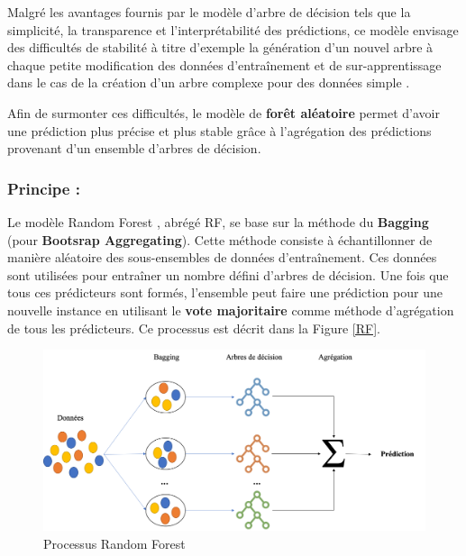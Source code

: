 \documentclass[11pt]{article}
\begin{document}
Malgré les avantages fournis par le modèle d'arbre de décision tels que la simplicité, la transparence et l’interprétabilité des prédictions, ce modèle envisage des difficultés de stabilité à titre d'exemple la génération d'un nouvel arbre à chaque petite modification des données d’entraînement \cite{hands} et de sur-apprentissage dans le cas de la création d'un arbre complexe pour des données simple \cite{hands}.\par

Afin de surmonter ces difficultés, le modèle de \textbf{forêt aléatoire} permet d'avoir une prédiction plus précise et plus stable grâce à l’agrégation des prédictions provenant d'un ensemble d'arbres de décision.\par 

\subsubsection{Principe :}

Le modèle Random Forest \citep{breiman2001random}, abrégé RF, se base sur la méthode du \textbf{Bagging} (pour \textbf{Bootsrap Aggregating}).
Cette méthode consiste à échantillonner de manière aléatoire des sous-ensembles de données d'entraînement.
Ces données sont utilisées pour entraîner un nombre défini d'arbres de décision.
Une fois que tous ces prédicteurs sont formés, l'ensemble peut faire une prédiction pour une nouvelle instance en utilisant le \textbf{vote majoritaire} comme méthode d’agrégation de tous les prédicteurs.
Ce processus est décrit dans la Figure \autoref{RF}.\par


\begin{figure}[hbt!]
    \centering
    \includegraphics[width = 15 cm]{./figures/RF.png}
    \caption{Processus Random Forest}
    \label{RF}
\end{figure}
\FloatBarrier
\end{document}
